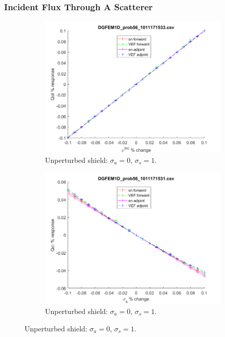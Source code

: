 \documentclass[12pt]{report}
\newcommand{\sigs}{\sigma_s}
\newcommand{\siga}{\sigma_a}
\begin{document}
\subsubsection{Incident Flux Through A Scatterer}

\begin{figure}[H]
\label{Scatterer}
\centering
\begin{subfigure}{.5\textwidth}
  \centering
  \includegraphics[width=.98\linewidth]{figures/56incSens.png}
  \caption{Unperturbed shield: $\siga=0$, $\sigs=1$. }
  \label{fig:sfig1}
\end{subfigure}%
\begin{subfigure}{.5\textwidth}
  \centering
  \includegraphics[width=.98\linewidth]{figures/56sigsSens.png}
  \caption{Unperturbed shield: $\siga=0$, $\sigs=1$. }
  \label{fig:sfig2}
\end{subfigure}
\end{figure}
\end{document}
